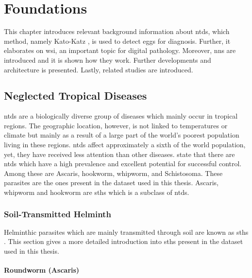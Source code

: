 \chapter{Foundations}
\label{ch:Foundations}

This chapter introduces relevant background information about \acfp{ntd}, which method, namely Kato-Katz \cite{katz1972simple}, is used to detect eggs for diagnosis. Further, it elaborates on \acf{wsi}, an important topic for digital pathology. Moreover, \acfp{nn} are introduced and it is shown how they work. Further developments and architecture is presented. Lastly, related studies are introduced.

\section{Neglected Tropical Diseases}
\label{sec:Foundations:NTDs}

\Acfp{ntd} \cite{feasey2010neglected} are a biologically diverse group of diseases which mainly occur in tropical regions. The geographic location, however, is not linked to temperatures or climate but mainly as a result of a large part of the world's poorest population living in these regions. \Acp{ntd} affect approximately a sixth of the world population, yet, they have received less attention than other diseases. \textcite{feasey2010neglected} state that there are \acp{ntd} which have a high prevalence and excellent potential for successful control. Among these are Ascaris, hookworm, whipworm, and Schistosoma. These parasites are the ones present in the dataset used in this thesis. Ascaris, whipworm and hookworm are \acfp{sth} which is a subclass of \acp{ntd}.

\subsection{Soil-Transmitted Helminth} %
\label{sec:Foundations:NTDs:STHs} 

Helminthic parasites which are mainly transmitted through soil are known as \acfp{sth} \cite{feasey2010neglected,jourdan2018soiltransmitted}. This section gives a more detailed introduction into \acp{sth} present in the dataset used in this thesis.


\subsubsection{Roundworm (Ascaris)}
\label{sec:Foundations:NTDs:STHs:Ascaris}

